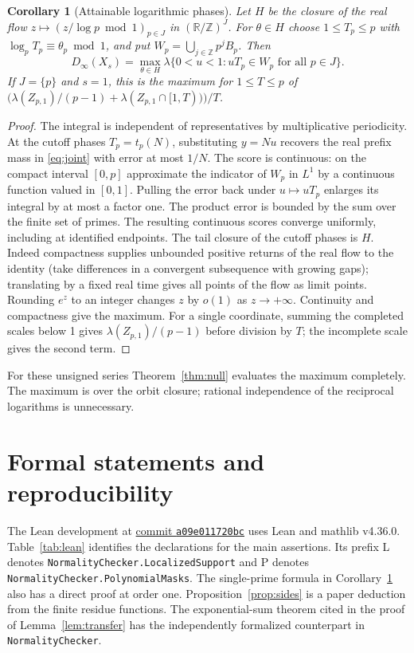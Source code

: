 \documentclass[11pt]{article}
\newtheorem{corollary}[theorem]{Corollary}
\newcommand{\Z}{\mathbb Z}
\newcommand{\R}{\mathbb R}
\newcommand{\vol}{\lambda}
\newcommand{\dd}{D_{\infty}}
\newcommand{\repo}{https://github.com/eldernos/MathematicsResearch}
\newcommand{\sha}{a09e011720bc74396a27f4cb3ce2d8a5b3ce5035}
\newcommand{\decl}[3]{\href{\repo/blob/\sha/NormalityChecker/#1.lean\#L#2}{\texttt{\detokenize{#3}}}}
\begin{document}
\begin{corollary}[Attainable logarithmic phases]\label{cor:flow}
Let \(H\) be the closure of the real flow \(z\mapsto(z/\log p\bmod1)_{p\in J}\) in \((\R/\Z)^J\). For \(\theta\in H\) choose \(1\le T_p\le p\) with \(\log_p T_p\equiv\theta_p\bmod1\), and put \(W_p=\bigcup_{j\in\Z}p^jB_p\). Then
\[
 \dd(X_s)=\max_{\theta\in H}
 \vol\{0<u<1:uT_p\in W_p\text{ for all }p\in J\}.
\]
If \(J=\{p\}\) and \(s=1\), this is the maximum for \(1\le T\le p\) of
\(\big(\vol(Z_{p,1})/(p-1)+\vol(Z_{p,1}\cap[1,T))\big)/T\).
\end{corollary}
\begin{proof}
The integral is independent of representatives by multiplicative periodicity. At the cutoff phases \(T_p=t_p(N)\), substituting \(y=Nu\) recovers the real prefix mass in \eqref{eq:joint} with error at most \(1/N\). The score is continuous: on the compact interval \([0,p]\) approximate the indicator of \(W_p\) in \(L^1\) by a continuous function valued in \([0,1]\). Pulling the error back under \(u\mapsto uT_p\) enlarges its integral by at most a factor one. The product error is bounded by the sum over the finite set of primes. The resulting continuous scores converge uniformly, including at identified endpoints. The tail closure of the cutoff phases is \(H\). Indeed compactness supplies unbounded positive returns of the real flow to the identity (take differences in a convergent subsequence with growing gaps); translating by a fixed real time gives all points of the flow as limit points. Rounding \(e^z\) to an integer changes \(z\) by \(o(1)\) as \(z\to+\infty\). Continuity and compactness give the maximum. For a single coordinate, summing the completed scales below 1 gives \(\vol(Z_{p,1})/(p-1)\) before division by \(T\); the incomplete scale gives the second term.
\end{proof}

For these unsigned series Theorem~\ref{thm:null} evaluates the maximum completely. The maximum is over the orbit closure; rational independence of the reciprocal logarithms is unnecessary.

\section{Formal statements and reproducibility}\label{sec:formal}
The Lean development at \href{\repo/tree/\sha}{commit \texttt{a09e011720bc}} uses Lean and mathlib v4.36.0. Table~\ref{tab:lean} identifies the declarations for the main assertions. Its prefix L denotes \texttt{NormalityChecker.LocalizedSupport} and P denotes \texttt{NormalityChecker.PolynomialMasks}. The single-prime formula in Corollary~\ref{cor:flow} also has a direct proof at order one. Proposition~\ref{prop:sides} is a paper deduction from the finite residue functions. The exponential-sum theorem cited in the proof of Lemma~\ref{lem:transfer} has the independently formalized counterpart \decl{SmoothOrbit}{207}{fixed_support_orbit_estimate} in \texttt{NormalityChecker}.
\end{document}
